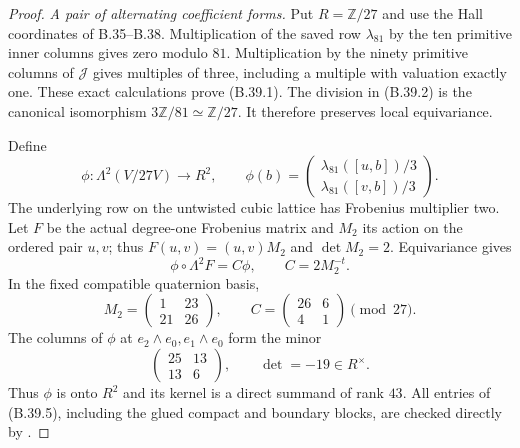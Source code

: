 \begin{proof}
\emph{A pair of alternating coefficient forms.}
Put $R=\mathbb Z/27$ and use the Hall coordinates of
B.35--B.38. Multiplication of the saved row
$\lambda_{81}$ by the ten primitive inner columns
gives zero modulo $81$. Multiplication by the ninety
primitive columns of $\mathcal J$ gives multiples of
three, including a multiple with valuation exactly
one. These exact calculations prove (B.39.1).
The division in (B.39.2) is the canonical isomorphism
$3\mathbb Z/81\simeq\mathbb Z/27$.
It therefore preserves local equivariance.

Define
\[
 \phi:\Lambda^2(V/27V)\longrightarrow R^2,
 \qquad
 \phi(b)=
 \begin{pmatrix}
 \lambda_{81}([u,b])/3\\
 \lambda_{81}([v,b])/3
 \end{pmatrix}.
                                                               \tag{B.39.4}
\]
The underlying row on the untwisted cubic lattice
has Frobenius multiplier two. Let $F$ be the actual
degree-one Frobenius matrix and $M_2$ its action on
the ordered pair $u,v$; thus
$F(u,v)=(u,v)M_2$ and $\det M_2=2$.
Equivariance gives
\[
 \phi\circ\Lambda^2F=C\phi,
 \qquad C=2M_2^{-t}.
                                                               \tag{B.39.5}
\]
In the fixed compatible quaternion basis,
\[
 M_2=\begin{pmatrix}1&23\\21&26\end{pmatrix},
 \qquad C=\begin{pmatrix}26&6\\4&1\end{pmatrix}
                  \pmod{27}.
                                                               \tag{B.39.6}
\]
The columns of $\phi$ at
$e_2\wedge e_0,e_1\wedge e_0$ form the minor
\[
                     \begin{pmatrix}25&13\\13&6\end{pmatrix},
 \qquad \det=-19\in R^\times.
                                                               \tag{B.39.7}
\]
Thus $\phi$ is onto $R^2$ and its kernel is a direct
summand of rank $43$.
All entries of (B.39.5), including the glued compact
and boundary blocks, are checked directly by
.


\end{proof}
